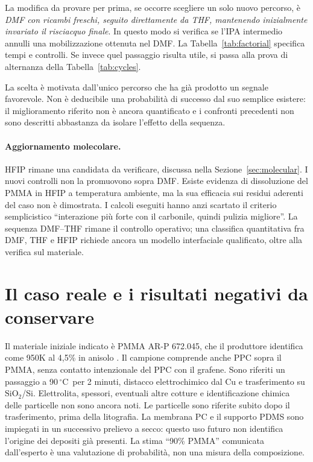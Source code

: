 \documentclass[11pt,reqno]{amsart}
\numberwithin{equation}{section}
\newcommand{\SiO}{\ensuremath{\mathrm{SiO}_2}}
\newcommand{\degC}{\ensuremath{^{\circ}\mathrm{C}}}
\begin{document}
La modifica da provare per prima, se occorre scegliere un solo
nuovo percorso, \`e \emph{DMF con ricambi freschi, seguito direttamente
da THF, mantenendo inizialmente invariato il risciacquo finale}.
In questo modo si verifica se l'IPA intermedio annulli una
mobilizzazione ottenuta nel DMF. La Tabella~\ref{tab:factorial}
specifica tempi e controlli. Se invece quel passaggio risulta utile,
si passa alla prova di alternanza della Tabella~\ref{tab:cycles}.

La scelta \`e motivata dall'unico percorso che ha gi\`a prodotto un
segnale favorevole. Non \`e deducibile una probabilit\`a di successo
dal suo semplice esistere: il miglioramento riferito non \`e ancora
quantificato e i confronti precedenti non sono descritti abbastanza
da isolare l'effetto della sequenza.


\paragraph{Aggiornamento molecolare.}
HFIP rimane una candidata da verificare, discussa nella Sezione~\ref{sec:molecular}. I nuovi controlli non la promuovono sopra DMF.
Esiste evidenza di dissoluzione del PMMA in HFIP a temperatura ambiente,
ma la sua efficacia sui residui aderenti del caso non \`e dimostrata.
I calcoli eseguiti hanno anzi scartato il criterio semplicistico
``interazione pi\`u forte con il carbonile, quindi pulizia migliore''.
La sequenza DMF--THF rimane il controllo operativo; una classifica
quantitativa fra DMF, THF e HFIP richiede ancora un modello interfaciale
qualificato, oltre alla verifica sul materiale.

\section{Il caso reale e i risultati negativi da conservare}

Il materiale iniziale indicato \`e PMMA AR-P 672.045, che il produttore
identifica come 950K al 4,5\% in anisolo \cite{Allresist}. Il campione
comprende anche PPC sopra il PMMA, senza contatto intenzionale del
PPC con il grafene. Sono riferiti un passaggio a 90\,\degC\ per
2 minuti, distacco elettrochimico dal Cu e trasferimento su \SiO/Si.
Elettrolita, spessori, eventuali altre cotture e identificazione
chimica delle particelle non sono ancora noti.
Le particelle sono riferite subito dopo il trasferimento, prima della
litografia. La membrana PC e il supporto PDMS sono impiegati in un
successivo prelievo a secco: questo uso futuro non identifica l'origine
dei depositi gi\`a presenti. La stima ``90\% PMMA'' comunicata dall'esperto
\`e una valutazione di probabilit\`a, non una misura della composizione.
\end{document}
